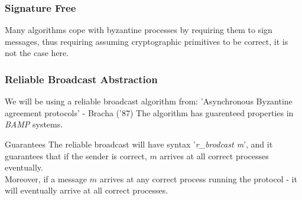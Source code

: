 \begin{frame}
    \frametitle{Signature Free}
    Many algorithms cope with byzantine processes by requiring them to sign messages,
    thus requiring assuming cryptographic primitives to be correct, it is not the case here.
\end{frame}

\begin{frame}
    \frametitle{Reliable Broadcast Abstraction}
    We will be using a reliable broadcast algorithm from:
    'Asynchronous Byzantine agreement protocols' - Bracha ('87)
    The algorithm has guarenteed properties in \emph{BAMP} systems.
    \begin{block}{Guarantees}
        The reliable broadcast will have syntax '\emph{r\_brodcast m}',
        and it guarantees that if the sender
        is correct, $m$ arrives at all correct processes eventually.\\
        Moreover, if a message $m$ arrives at any correct process running the protocol -
        it will eventually arrive at all correct processes.
    \end{block}
\end{frame}

